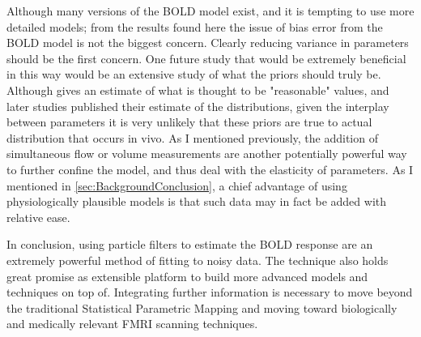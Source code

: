 Although many versions of the BOLD model exist, and it is tempting to use 
more detailed models; from the results found here the issue of bias error
from the BOLD model is not the biggest concern. Clearly reducing variance
in parameters should be the first concern. 
One future study that would be extremely beneficial in this way  would
be an extensive study of what the priors should truly be. Although \cite{Friston2000}
gives an estimate of what is thought to be "reasonable" values, and later studies
published their estimate of the distributions, given the interplay between
parameters it is very unlikely that these priors are true to actual distribution
that occurs in vivo. As I mentioned previously, the addition of simultaneous
flow or volume measurements are another potentially powerful way to further confine the model,
and thus deal with the elasticity of parameters. As I mentioned in 
\autoref{sec:BackgroundConclusion}, a chief advantage of using physiologically
plausible models is that such data may in fact be added with relative ease.

In conclusion, using particle filters to estimate the BOLD response are 
an extremely powerful method of fitting to noisy data. The technique also
holds great promise as extensible platform to build more advanced models
and techniques on top of. Integrating further information is necessary to
move beyond the traditional Statistical Parametric Mapping and moving
toward biologically and medically relevant FMRI scanning techniques. 
